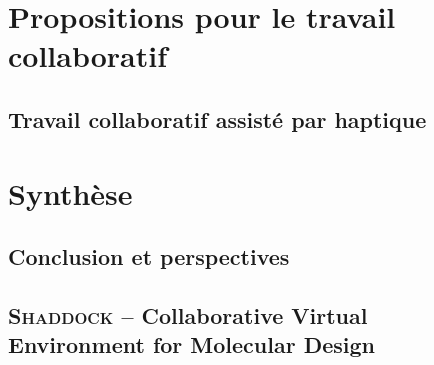 \documentclass[myfrancais]{mythesis}
\begin{document}
	\part{Propositions pour le travail collaboratif}
	\chapter{Travail collaboratif assisté par haptique}
	\part{Synthèse}
	\chapter{Conclusion et perspectives}

	\myglossary
	\appendix
	\chapter{\textsc{Shaddock} -- Collaborative Virtual Environment for Molecular Design}
\end{document}

